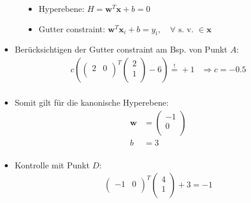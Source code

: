 \begin{frame}
\begin{figure}[h]
\begin{minipage}{0.4\textwidth}
{\begin{figure}[h]
{                    }
                \end{figure}
            }
        \end{minipage}
        \hfill
        \begin{minipage}{0.4\textwidth}
            \begin{itemize}
                \item<1-> Hyperebene: $ H = \boldsymbol{w}^T \boldsymbol{x} + b = 0 $
                \item<1-> Gutter constraint: $ \boldsymbol{w}^T \boldsymbol{x}_i + b = y_i, \quad \forall \text{ s. v. } \in \boldsymbol{x} $
            \end{itemize} 
        \end{minipage}
    \end{figure}

    \begin{itemize}
        \item<1-> Berücksichtigen der Gutter constraint am Bsp. von Punkt $A$:
            \begin{align*}
                c \left( \left( \begin{matrix}
                    2 & 0 \\
                \end{matrix} \right)^T \left( \begin{matrix}
                    2 \\
                    1 \\
                \end{matrix} \right) - 6 \right) \overset{!}{=} +1 &\Rightarrow c = -0.5 \\
            \end{align*}
        \item<2-> Somit gilt für die kanonische Hyperebene:
            \begin{align*}
                \boldsymbol{w} &= \left( \begin{matrix}
                    -1 \\
                    0 \\
                \end{matrix} \right) \\
                b &= 3 \\ 
            \end{align*}
        \item<3-> Kontrolle mit Punkt $D$:
            \begin{align*}
                \left( \begin{matrix}
                    -1 & 0 \\
                \end{matrix} \right)^T \left( \begin{matrix}
                    4 \\
                    1 \\
                \end{matrix} \right) + 3 = -1
            \end{align*}
    \end{itemize}
\end{frame}

